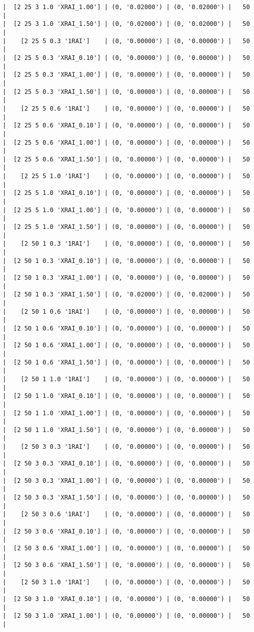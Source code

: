 \documentclass{article}
\begin{document}
\begin{verbatim}
|  [2 25 3 1.0 'XRAI_1.00'] | (0, '0.02000') | (0, '0.02000') |   50  |
|  [2 25 3 1.0 'XRAI_1.50'] | (0, '0.02000') | (0, '0.02000') |   50  |
|    [2 25 5 0.3 '1RAI']    | (0, '0.00000') | (0, '0.00000') |   50  |
|  [2 25 5 0.3 'XRAI_0.10'] | (0, '0.00000') | (0, '0.00000') |   50  |
|  [2 25 5 0.3 'XRAI_1.00'] | (0, '0.00000') | (0, '0.00000') |   50  |
|  [2 25 5 0.3 'XRAI_1.50'] | (0, '0.00000') | (0, '0.00000') |   50  |
|    [2 25 5 0.6 '1RAI']    | (0, '0.00000') | (0, '0.00000') |   50  |
|  [2 25 5 0.6 'XRAI_0.10'] | (0, '0.00000') | (0, '0.00000') |   50  |
|  [2 25 5 0.6 'XRAI_1.00'] | (0, '0.00000') | (0, '0.00000') |   50  |
|  [2 25 5 0.6 'XRAI_1.50'] | (0, '0.00000') | (0, '0.00000') |   50  |
|    [2 25 5 1.0 '1RAI']    | (0, '0.00000') | (0, '0.00000') |   50  |
|  [2 25 5 1.0 'XRAI_0.10'] | (0, '0.00000') | (0, '0.00000') |   50  |
|  [2 25 5 1.0 'XRAI_1.00'] | (0, '0.00000') | (0, '0.00000') |   50  |
|  [2 25 5 1.0 'XRAI_1.50'] | (0, '0.00000') | (0, '0.00000') |   50  |
|    [2 50 1 0.3 '1RAI']    | (0, '0.00000') | (0, '0.00000') |   50  |
|  [2 50 1 0.3 'XRAI_0.10'] | (0, '0.00000') | (0, '0.00000') |   50  |
|  [2 50 1 0.3 'XRAI_1.00'] | (0, '0.00000') | (0, '0.00000') |   50  |
|  [2 50 1 0.3 'XRAI_1.50'] | (0, '0.02000') | (0, '0.02000') |   50  |
|    [2 50 1 0.6 '1RAI']    | (0, '0.00000') | (0, '0.00000') |   50  |
|  [2 50 1 0.6 'XRAI_0.10'] | (0, '0.00000') | (0, '0.00000') |   50  |
|  [2 50 1 0.6 'XRAI_1.00'] | (0, '0.00000') | (0, '0.00000') |   50  |
|  [2 50 1 0.6 'XRAI_1.50'] | (0, '0.00000') | (0, '0.00000') |   50  |
|    [2 50 1 1.0 '1RAI']    | (0, '0.00000') | (0, '0.00000') |   50  |
|  [2 50 1 1.0 'XRAI_0.10'] | (0, '0.00000') | (0, '0.00000') |   50  |
|  [2 50 1 1.0 'XRAI_1.00'] | (0, '0.00000') | (0, '0.00000') |   50  |
|  [2 50 1 1.0 'XRAI_1.50'] | (0, '0.00000') | (0, '0.00000') |   50  |
|    [2 50 3 0.3 '1RAI']    | (0, '0.00000') | (0, '0.00000') |   50  |
|  [2 50 3 0.3 'XRAI_0.10'] | (0, '0.00000') | (0, '0.00000') |   50  |
|  [2 50 3 0.3 'XRAI_1.00'] | (0, '0.00000') | (0, '0.00000') |   50  |
|  [2 50 3 0.3 'XRAI_1.50'] | (0, '0.00000') | (0, '0.00000') |   50  |
|    [2 50 3 0.6 '1RAI']    | (0, '0.00000') | (0, '0.00000') |   50  |
|  [2 50 3 0.6 'XRAI_0.10'] | (0, '0.00000') | (0, '0.00000') |   50  |
|  [2 50 3 0.6 'XRAI_1.00'] | (0, '0.00000') | (0, '0.00000') |   50  |
|  [2 50 3 0.6 'XRAI_1.50'] | (0, '0.00000') | (0, '0.00000') |   50  |
|    [2 50 3 1.0 '1RAI']    | (0, '0.00000') | (0, '0.00000') |   50  |
|  [2 50 3 1.0 'XRAI_0.10'] | (0, '0.00000') | (0, '0.00000') |   50  |
|  [2 50 3 1.0 'XRAI_1.00'] | (0, '0.00000') | (0, '0.00000') |   50  |

\end{verbatim}
\end{document}
